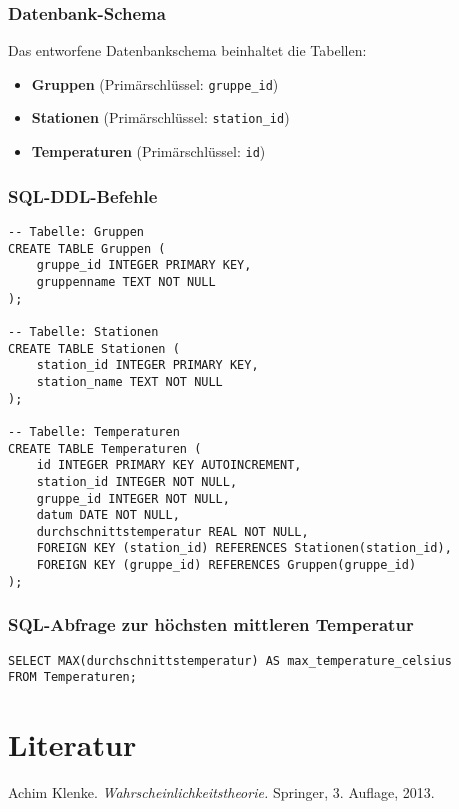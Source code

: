 \documentclass[12pt]{article}
\begin{document}
\subsubsection{Datenbank-Schema}
Das entworfene Datenbankschema beinhaltet die Tabellen:
\begin{itemize}
    \item \textbf{Gruppen} (Primärschlüssel: \texttt{gruppe\_id})
    \item \textbf{Stationen} (Primärschlüssel: \texttt{station\_id})
    \item \textbf{Temperaturen} (Primärschlüssel: \texttt{id})
\end{itemize}

\subsubsection{SQL-DDL-Befehle}
\begin{verbatim}
-- Tabelle: Gruppen
CREATE TABLE Gruppen (
    gruppe_id INTEGER PRIMARY KEY,
    gruppenname TEXT NOT NULL
);

-- Tabelle: Stationen
CREATE TABLE Stationen (
    station_id INTEGER PRIMARY KEY,
    station_name TEXT NOT NULL
);

-- Tabelle: Temperaturen
CREATE TABLE Temperaturen (
    id INTEGER PRIMARY KEY AUTOINCREMENT,
    station_id INTEGER NOT NULL,
    gruppe_id INTEGER NOT NULL,
    datum DATE NOT NULL,
    durchschnittstemperatur REAL NOT NULL,
    FOREIGN KEY (station_id) REFERENCES Stationen(station_id),
    FOREIGN KEY (gruppe_id) REFERENCES Gruppen(gruppe_id)
);
\end{verbatim}

\subsubsection{SQL-Abfrage zur höchsten mittleren Temperatur}
\begin{verbatim}
SELECT MAX(durchschnittstemperatur) AS max_temperature_celsius
FROM Temperaturen;
\end{verbatim}

\section*{Literatur}
\begin{thebibliography}{1}
 Achim Klenke. \textit{Wahrscheinlichkeitstheorie.} Springer, 3. Auflage, 2013.
\end{thebibliography}
\end{document}
